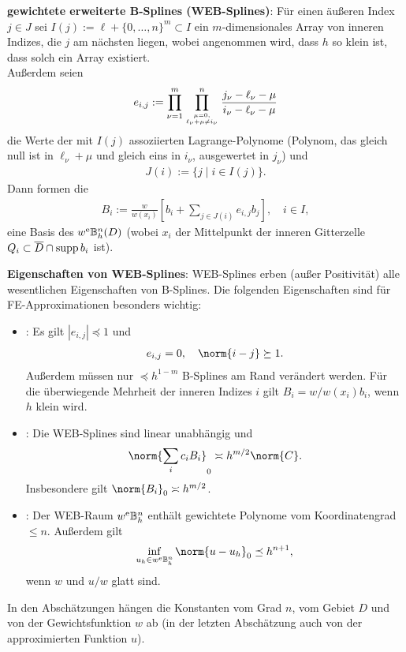 \textbf{gewichtete erweiterte B-Splines (WEB-Splines)}:
Für einen äußeren Index $j \in J$ sei $I(j) := \ell + \{0, \dotsc, n\}^m \subset I$ ein
$m$-dimensionales Array von inneren Indizes, die $j$ am nächsten liegen,
wobei angenommen wird, dass $h$ so klein ist, dass solch ein Array existiert.\\
Außerdem seien
\begin{align*}
    e_{i,j} := \prod_{\nu=1}^m \prod_{\genfrac{}{}{0pt}{}{\mu=0,}{\ell_\nu+\mu\not=i_\nu}}^n
    \frac{j_\nu - \ell_\nu - \mu}{i_\nu-\ell_\nu-\mu}
\end{align*}
die Werte der mit $I(j)$ assoziierten Lagrange-Polynome
(Polynom, das gleich null ist in $\ell_\nu + \mu$ und gleich eins in $i_\nu$,
ausgewertet in $j_\nu$) und
\begin{align*}
    J(i) := \{j \;|\; i \in I(j)\}.
\end{align*}
Dann formen die 
\begin{align*}
    B_i := \frac{w}{w(x_i)} \left[b_i + \sum_{j \in J(i)} e_{i,j} b_j\right],\quad i \in I,
\end{align*}
eine Basis des  $w^{\mathrm{e}}\mathbb{B}_h^n(D)$
(wobei $x_i$ der Mittelpunkt der inneren Gitterzelle\\
$Q_i \subset \overline{D} \cap \operatorname{supp} b_i$ ist).

\linie
\pagebreak

\textbf{Eigenschaften von WEB-Splines}:
WEB-Splines erben (außer Positivität) alle wesentlichen Eigenschaften von B-Splines.
Die folgenden Eigenschaften sind für FE-Approximationen besonders wichtig:
\begin{itemize}
    \item
    :
    Es gilt $|e_{i,j}| \preceq 1$ und
    \begin{align*}
        e_{i,j} = 0,\quad
        \norm{i - j} \succeq 1.
    \end{align*}
    Außerdem müssen nur $\preceq h^{1-m}$ B-Splines am Rand verändert werden.
    Für die überwiegende
    Mehrheit der inneren Indizes $i$ gilt $B_i = w/w(x_i) b_i$, wenn $h$ klein wird.
    
    \item
    :
    Die WEB-Splines sind linear unabhängig und
    \begin{align*}
        \norm{\sum_i c_i B_i}_0 \asymp h^{m/2} \norm{C}.
    \end{align*}
    Insbesondere gilt $\norm{B_i}_0 \asymp h^{m/2}$.
    
    \item
    :
    Der WEB-Raum $w^{\mathrm{e}}\mathbb{B}_h^n$ enthält gewichtete Polynome vom Koordinatengrad $\le n$.
    Außerdem gilt
    \begin{align*}
        \inf_{u_h \in w^\e\BB_h^n} \norm{u - u_h}_0 \preceq h^{n+1},
    \end{align*}
    wenn $w$ und $u/w$ glatt sind.
\end{itemize}
In den Abschätzungen hängen die Konstanten vom Grad $n$, vom Gebiet $D$ und von der
Gewichtsfunktion $w$ ab (in der letzten Abschätzung auch von der approximierten
Funktion $u$).

